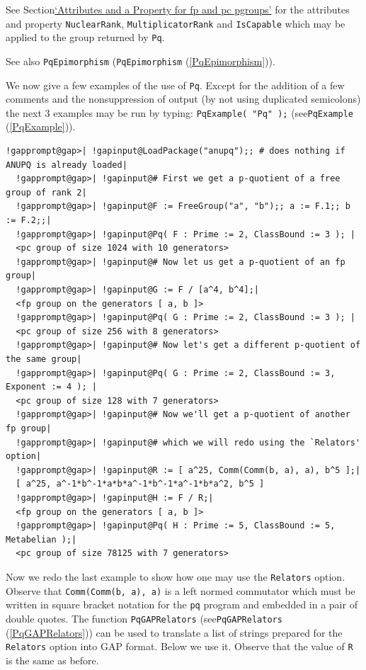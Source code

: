\documentclass[a4paper,11pt]{report}
\begin{document}
{{{ See Section{\nobreakspace}\hyperref[Attributes and a Property for fp and pc p-groups]{`Attributes and a Property for fp and pc p\texttt{}groups'} for the attributes and property \texttt{NuclearRank}, \texttt{MultiplicatorRank} and \texttt{IsCapable} which may be applied to the group returned by \texttt{Pq}. 

 See also \texttt{PqEpimorphism} (\texttt{PqEpimorphism} (\ref{PqEpimorphism})). 

 We now give a few examples of the use of \texttt{Pq}. Except for the addition of a few comments and the
non\texttt{}suppression of output (by not using duplicated
semicolons) the next 3 examples may be run by typing: \texttt{PqExample( "Pq" );} (see{\nobreakspace}\texttt{PqExample} (\ref{PqExample})). 
\begin{Verbatim}[commandchars=!@|,fontsize=\small,frame=single,label=Example]
  !gapprompt@gap>| !gapinput@LoadPackage("anupq");; # does nothing if ANUPQ is already loaded|
  !gapprompt@gap>| !gapinput@# First we get a p-quotient of a free group of rank 2|
  !gapprompt@gap>| !gapinput@F := FreeGroup("a", "b");; a := F.1;; b := F.2;;|
  !gapprompt@gap>| !gapinput@Pq( F : Prime := 2, ClassBound := 3 ); |
  <pc group of size 1024 with 10 generators>
  !gapprompt@gap>| !gapinput@# Now let us get a p-quotient of an fp group|
  !gapprompt@gap>| !gapinput@G := F / [a^4, b^4];|
  <fp group on the generators [ a, b ]>
  !gapprompt@gap>| !gapinput@Pq( G : Prime := 2, ClassBound := 3 ); |
  <pc group of size 256 with 8 generators>
  !gapprompt@gap>| !gapinput@# Now let's get a different p-quotient of the same group|
  !gapprompt@gap>| !gapinput@Pq( G : Prime := 2, ClassBound := 3, Exponent := 4 ); |
  <pc group of size 128 with 7 generators>
  !gapprompt@gap>| !gapinput@# Now we'll get a p-quotient of another fp group|
  !gapprompt@gap>| !gapinput@# which we will redo using the `Relators' option|
  !gapprompt@gap>| !gapinput@R := [ a^25, Comm(Comm(b, a), a), b^5 ];|
  [ a^25, a^-1*b^-1*a*b*a^-1*b^-1*a^-1*b*a^2, b^5 ]
  !gapprompt@gap>| !gapinput@H := F / R;|
  <fp group on the generators [ a, b ]>
  !gapprompt@gap>| !gapinput@Pq( H : Prime := 5, ClassBound := 5, Metabelian );|
  <pc group of size 78125 with 7 generators>
\end{Verbatim}
  Now we redo the last example to show how one may use the \texttt{Relators} option. Observe that \texttt{Comm(Comm(b, a), a)} is a left normed commutator which must be written in square bracket notation
for the \texttt{pq} program and embedded in a pair of double quotes. The function \texttt{PqGAPRelators} (see{\nobreakspace}\texttt{PqGAPRelators} (\ref{PqGAPRelators})) can be used to translate a list of strings prepared for the \texttt{Relators} option into \textsf{GAP} format. Below we use it. Observe that the value of \texttt{R} is the same as before. 
}}}
\end{document}
